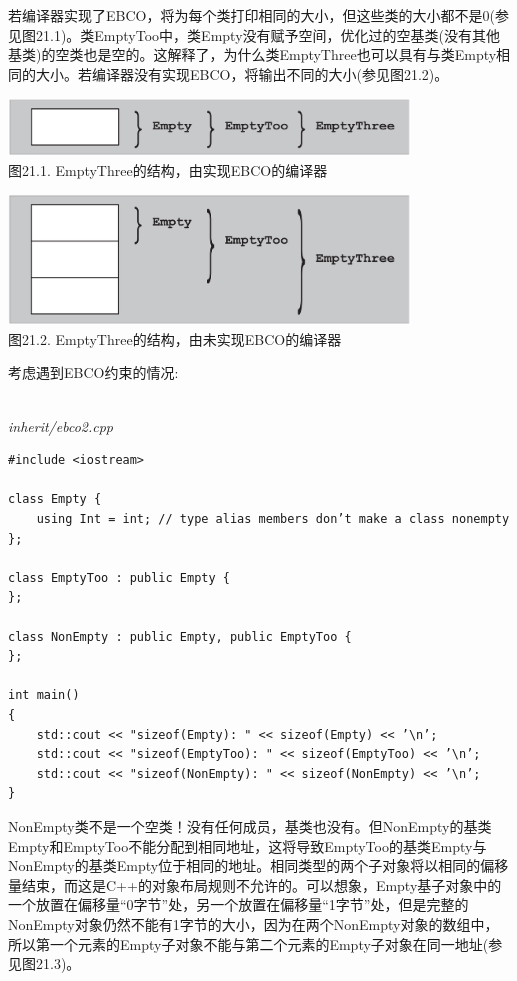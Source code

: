 若编译器实现了EBCO，将为每个类打印相同的大小，但这些类的大小都不是0(参见图21.1)。类EmptyToo中，类Empty没有赋予空间，优化过的空基类(没有其他基类)的空类也是空的。这解释了，为什么类EmptyThree也可以具有与类Empty相同的大小。若编译器没有实现EBCO，将输出不同的大小(参见图21.2)。

\begin{center}
\includegraphics[width=0.8\textwidth]{content/3/chapter21/images/1.png} \\
图21.1. EmptyThree的结构，由实现EBCO的编译器
\end{center}

\begin{center}
\includegraphics[width=0.8\textwidth]{content/3/chapter21/images/2.png} \\
图21.2. EmptyThree的结构，由未实现EBCO的编译器
\end{center}

考虑遇到EBCO约束的情况:

\hspace*{\fill} \\ %
\noindent
\textit{inherit/ebco2.cpp}
\begin{lstlisting}[style=styleCXX]
#include <iostream>

class Empty {
	using Int = int; // type alias members don’t make a class nonempty
};

class EmptyToo : public Empty {
};

class NonEmpty : public Empty, public EmptyToo {
};

int main()
{
	std::cout << "sizeof(Empty): " << sizeof(Empty) << ’\n’;
	std::cout << "sizeof(EmptyToo): " << sizeof(EmptyToo) << ’\n’;
	std::cout << "sizeof(NonEmpty): " << sizeof(NonEmpty) << ’\n’;
}
\end{lstlisting}

NonEmpty类不是一个空类！没有任何成员，基类也没有。但NonEmpty的基类Empty和EmptyToo不能分配到相同地址，这将导致EmptyToo的基类Empty与NonEmpty的基类Empty位于相同的地址。相同类型的两个子对象将以相同的偏移量结束，而这是C++的对象布局规则不允许的。可以想象，Empty基子对象中的一个放置在偏移量“0字节”处，另一个放置在偏移量“1字节”处，但是完整的NonEmpty对象仍然不能有1字节的大小，因为在两个NonEmpty对象的数组中，所以第一个元素的Empty子对象不能与第二个元素的Empty子对象在同一地址(参见图21.3)。

